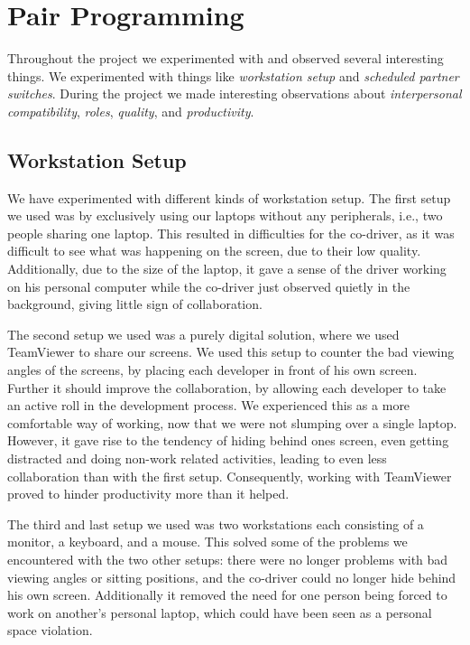 \section{Pair Programming}
Throughout the project we experimented with and observed several interesting things.
We experimented with things like \textit{workstation setup} and \textit{scheduled partner switches}.
During the project we made interesting observations about \textit{interpersonal compatibility}, \textit{roles}, \textit{quality}, and \textit{productivity}.

\subsection{Workstation Setup}
We have experimented with different kinds of workstation setup.
The first setup we used was by exclusively using our laptops without any peripherals, i.e., two people sharing one laptop.
This resulted in difficulties for the co-driver, as it was difficult to see what was happening on the screen, due to their low quality.
Additionally, due to the size of the laptop, it gave a sense of the driver working on his personal computer while the co-driver just observed quietly in the background, giving little sign of collaboration.

The second setup we used was a purely digital solution, where we used TeamViewer to share our screens.
We used this setup to counter the bad viewing angles of the screens, by placing each developer in front of his own screen.
Further it should improve the collaboration, by allowing each developer to take an active roll in the development process.
We experienced this as a more comfortable way of working, now that we were not slumping over a single laptop.
However, it gave rise to the tendency of hiding behind ones screen, even getting distracted and doing non-work related activities, leading to even less collaboration than with the first setup.
Consequently, working with TeamViewer proved to hinder productivity more than it helped.

The third and last setup we used was two workstations each consisting of a monitor, a keyboard, and a mouse.
This solved some of the problems we encountered with the two other setups: there were no longer problems with bad viewing angles or sitting positions, and the co-driver could no longer hide behind his own screen.
Additionally it removed the need for one person being forced to work on another's personal laptop, which could have been seen as a personal space violation.

